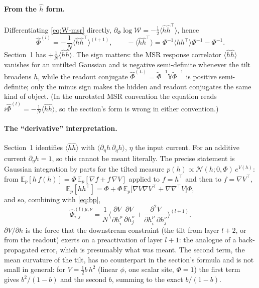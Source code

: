 \documentclass[11pt,a4paper]{article}
\newcommand{\W}{\mathcal W}
\newcommand{\E}{\mathbb E}
\begin{document}
\paragraph{From the $\hat h$ form.} Differentiating \eqref{eq:W-msr} directly,
$\partial_\Phi\log\W = -\frac12\langle\hat h\hat h^\top\rangle$, hence
\begin{equation}
  \hat\Phi^{(l)} = -\frac1N\langle\hat h\hat h^\top\rangle^{(l+1)},
  \qquad
  -\langle\hat h\hat h^\top\rangle = \Phi^{-1}\langle hh^\top\rangle\Phi^{-1} - \Phi^{-1}.
  \label{eq:hh}
\end{equation}
Section~1 has $+\frac1N\langle\hat h\hat h\rangle$. The sign matters: the MSR
response correlator $\langle\hat h\hat h\rangle$ vanishes for an untilted
Gaussian and is negative semi-definite whenever the tilt broadens $h$, while the
readout conjugate $\hat\Phi^{(L)} = \tilde\Phi^{-1}\mathbb Y\tilde\Phi^{-1}$ is
positive semi-definite; only the minus sign makes the hidden and readout
conjugates the same kind of object. (In the unrotated MSR convention the
equation reads $i\hat\Phi^{(l)} = -\frac1N\langle\hat h\hat h\rangle$, so the
section's form is wrong in either convention.)

\paragraph{The ``derivative'' interpretation.}
Section~1 identifies $\langle\hat h\hat h\rangle$ with
$\langle\partial_\eta h\,\partial_\eta h\rangle$, $\eta$ the input current. For an
additive current $\partial_\eta h = 1$, so this cannot be meant literally. The
precise statement is Gaussian integration by parts for the tilted measure
$p(h)\propto\mathcal N(h;0,\Phi)\,e^{V(h)}$: from
$\E_p[h\,f(h)] = \Phi\,\E_p[\nabla f + f\,\nabla V]$ applied to $f = h^\top$ and then to
$f = \nabla V^\top$,
\begin{equation}
  \E_p[hh^\top] = \Phi + \Phi\,\E_p\big[\nabla V\nabla V^\top + \nabla\nabla^\top V\big]\Phi,
\end{equation}
and so, combining with \eqref{eq:bp},
\begin{equation}
  \hat\Phi^{(l)\mu,\nu}_{i,j} = \frac1N\Big\langle
    \frac{\partial V}{\partial h^\mu_i}\frac{\partial V}{\partial h^\nu_j}
    + \frac{\partial^2V}{\partial h^\mu_i\,\partial h^\nu_j}\Big\rangle^{(l+1)} .
  \label{eq:stein}
\end{equation}
$\partial V/\partial h$ is the force that the downstream constraint (the tilt from
layer $l+2$, or from the readout) exerts on a preactivation of layer $l+1$: the
analogue of a back-propagated error, which is presumably what was meant. The
second term, the mean curvature of the tilt, has no counterpart in the
section's formula and is not small in general: for
$V = \frac12 b\,h^2$ (linear $\phi$, one scalar site, $\Phi = 1$) the first term
gives $b^2/(1-b)$ and the second $b$, summing to the exact $b/(1-b)$.
\end{document}
